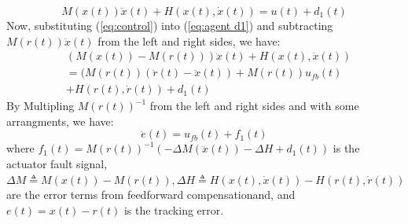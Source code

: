 \documentclass{ieeeaccess}
\newtheorem{remark}{Remark}
\begin{document}
\begin{equation} \label{eq:agent d1} 
    M(x(t))\ddot{x}(t) + H(x(t),\dot{x}(t)) = u(t) + d_1(t)
\end{equation}
Now, substituting (\ref{eq:control}) into (\ref{eq:agent d1}) and subtracting $M(r(t))\ddot{x}(t)$ from the left and right sides, we have:
\begin{equation} \label{eq:agent1}
    \begin{split}
        & (M(x(t))-M(r(t)))\ddot{x}(t) + H(x(t),\dot{x}(t)) \\
        & =(M(r(t))(\ddot{r}(t)-\ddot{x}(t)) + M(r(t))u_{fb}(t) \\
        & + H(r(t),\dot{r}(t)) + d_1(t)
    \end{split}
\end{equation}
By Multipling $M(r(t))^{-1}$ from the left and right sides and with some arrangments, we have:
\begin{equation} \label{eq:23}
    \ddot{e}(t) = u_{fb}(t) + f_1(t)
\end{equation}
where $f_1(t) = M(r(t))^{-1}(-\Delta M(\ddot{x}(t)) -\Delta H + d_1(t))$ is the actuator fault signal, $\Delta M \triangleq M(x(t)) - M(r(t)), \Delta H \triangleq H(x(t),\dot{x}(t)) - H(r(t),\dot{r}(t))$ are the error terms from feedforward compensationand, and $e(t)= x(t)-r(t)$ is the tracking error.
\end{document}
